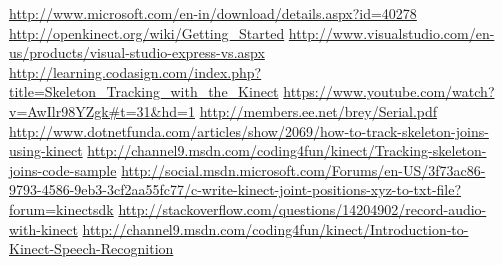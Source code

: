 \begin{thebibliography}{99}
 \url{http://www.microsoft.com/en-in/download/details.aspx?id=40278}
 \url{http://openkinect.org/wiki/Getting\_Started}
 \url{http://www.visualstudio.com/en-us/products/visual-studio-express-vs.aspx}
 \url{http://learning.codasign.com/index.php?title=Skeleton\_Tracking\_with\_the\_Kinect}
 \url{https://www.youtube.com/watch?v=AwIlr98YZgk#t=31\&hd=1}
 \url{http://members.ee.net/brey/Serial.pdf}
 \url{http://www.dotnetfunda.com/articles/show/2069/how-to-track-skeleton-joins-using-kinect}
 \url{http://channel9.msdn.com/coding4fun/kinect/Tracking-skeleton-joins-code-sample}
 \url{http://social.msdn.microsoft.com/Forums/en-US/3f73ac86-9793-4586-9eb3-3cf2aa55fc77/c-write-kinect-joint-positions-xyz-to-txt-file?forum=kinectsdk}
 \url{http://stackoverflow.com/questions/14204902/record-audio-with-kinect}
 \url{http://channel9.msdn.com/coding4fun/kinect/Introduction-to-Kinect-Speech-Recognition}
\end{thebibliography}